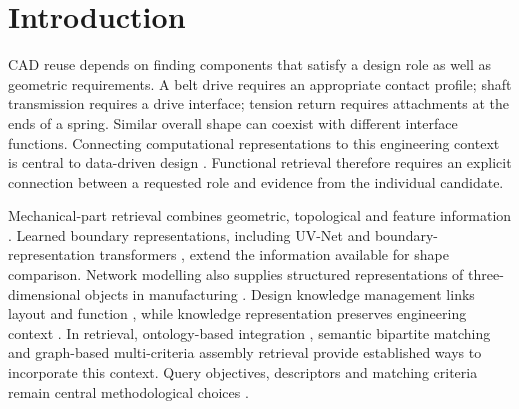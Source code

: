 \documentclass[10pt,a4paper,twocolumn]{article}
\begin{document}
\fontsize{9.5}{11.3}\selectfont
{}

\section{Introduction}

CAD reuse depends on finding components that satisfy a design role as well as geometric requirements. A belt drive requires an appropriate contact profile; shaft transmission requires a drive interface; tension return requires attachments at the ends of a spring. Similar overall shape can coexist with different interface functions. Connecting computational representations to this engineering context is central to data-driven design \cite{liu2024datadriven}. Functional retrieval therefore requires an explicit connection between a requested role and evidence from the individual candidate.

Mechanical-part retrieval combines geometric, topological and feature information \cite{chu2006similarity}. Learned boundary representations, including UV-Net \cite{jayaraman2021uvnet} and boundary-representation transformers \cite{zou2025brt}, extend the information available for shape comparison. Network modelling also supplies structured representations of three-dimensional objects in manufacturing \cite{yang2020network}. Design knowledge management links layout and function \cite{koh2003design}, while knowledge representation preserves engineering context \cite{chandrasegaran2013knowledge}. In retrieval, ontology-based integration \cite{qin2016ontology}, semantic bipartite matching \cite{han2018semantics} and graph-based multi-criteria assembly retrieval \cite{lupinetti2018multicriteria} provide established ways to incorporate this context. Query objectives, descriptors and matching criteria remain central methodological choices \cite{lupinetti2019survey}.
\end{document}
